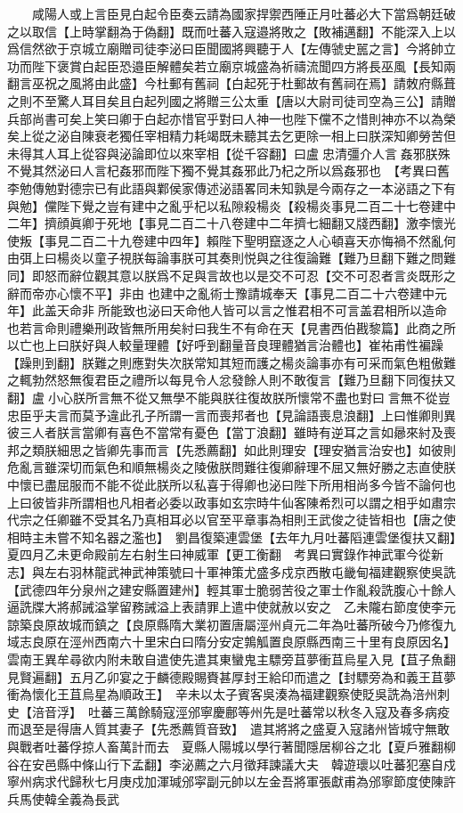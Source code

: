 　　咸陽人或上言臣見白起令臣奏云請為國家捍禦西陲正月吐蕃必大下當爲朝廷破之以取信【上時掌翻為于偽翻】既而吐蕃入寇邉將敗之【敗補邁翻】不能深入上以爲信然欲于京城立廟贈司徒李泌曰臣聞國將興聽于人【左傳虢史嚚之言】今將帥立功而陛下褒賞白起臣恐邉臣解體矣若立廟京城盛為祈禱流聞四方將長巫風【長知兩翻言巫祝之風將由此盛】今杜郵有舊祠【白起死于杜郵故有舊祠在焉】請敇府縣葺之則不至驚人耳目矣且白起列國之將贈三公太重【唐以大尉司徒司空為三公】請贈兵部尚書可矣上笑曰卿于白起亦惜官乎對曰人神一也陛下儻不之惜則神亦不以為榮矣上從之泌自陳衰老獨任宰相精力耗竭既未聽其去乞更除一相上曰朕深知卿勞苦但未得其人耳上從容與泌論即位以來宰相【從千容翻】曰盧忠清彊介人言姦邪朕殊不覺其然泌曰人言杞姦邪而陛下獨不覺其姦邪此乃杞之所以爲姦邪也　【考異曰舊李勉傳勉對德宗已有此語與鄴侯家傳述泌語畧同未知孰是今兩存之一本泌語之下有與勉】儻陛下覺之豈有建中之亂乎杞以私隙殺楊炎【殺楊炎事見二百二十七卷建中二年】擠顔眞卿于死地【事見二百二十八卷建中二年擠七細翻又牋西翻】激李懷光使叛【事見二百二十九卷建中四年】賴陛下聖明竄逐之人心頓喜天亦悔禍不然亂何由弭上曰楊炎以童子視朕每論事朕可其奏則悦與之往復論難【難乃旦翻下難之問難同】即怒而辭位觀其意以朕爲不足與言故也以是交不可忍【交不可忍者言炎既形之辭而帝亦心懷不平】非由也建中之亂術士豫請城奉天【事見二百二十六卷建中元年】此盖天命非所能致也泌曰天命他人皆可以言之惟君相不可言盖君相所以造命也若言命則禮樂刑政皆無所用矣紂曰我生不有命在天【見書西伯戡黎篇】此商之所以亡也上曰朕好與人較量理體【好呼到翻量音良理體猶言治體也】崔祐甫性褊躁【躁則到翻】朕難之則應對失次朕常知其短而護之楊炎論事亦有可采而氣色粗傲難之輒勃然怒無復君臣之禮所以每見令人忿發餘人則不敢復言【難乃旦翻下同復扶又翻】盧小心朕所言無不從又無學不能與朕往復故朕所懷常不盡也對曰言無不從豈忠臣乎夫言而莫予違此孔子所謂一言而喪邦者也【見論語喪息浪翻】上曰惟卿則異彼三人者朕言當卿有喜色不當常有憂色【當丁浪翻】雖時有逆耳之言如曏來紂及喪邦之類朕細思之皆卿先事而言【先悉薦翻】如此則理安【理安猶言治安也】如彼則危亂言雖深切而氣色和順無楊炎之陵傲朕問難往復卿辭理不屈又無好勝之志直使朕中懷已盡屈服而不能不從此朕所以私喜于得卿也泌曰陛下所用相尚多今皆不論何也上曰彼皆非所謂相也凡相者必委以政事如玄宗時牛仙客陳希烈可以謂之相乎如肅宗代宗之任卿雖不受其名乃真相耳必以官至平章事為相則王武俊之徒皆相也【唐之使相時主未嘗不知名器之濫也】　劉昌復築連雲堡【去年九月吐蕃䧟連雲堡復扶又翻】夏四月乙未更命殿前左右射生曰神威軍【更工衡翻　考異曰實錄作神武軍今從新志】與左右羽林龍武神武神策號曰十軍神策尤盛多戍京西散屯畿甸福建觀察使吳詵【武德四年分泉州之建安縣置建州】輕其軍士脆弱苦役之軍士作亂殺詵腹心十餘人逼詵牒大將郝誡溢掌留務誡溢上表請罪上遣中使就赦以安之　乙未隴右節度使李元諒築良原故城而鎮之【良原縣隋大業初置唐屬涇州貞元二年為吐蕃所破今乃修復九域志良原在涇州西南六十里宋白曰隋分安定鶉觚置良原縣西南三十里有良原因名】　雲南王異牟尋欲内附未敢自遣使先遣其東蠻鬼主驃旁苴夢衝苴烏星入見【苴子魚翻見賢遍翻】五月乙卯宴之于麟德殿賜賚甚厚封王給印而遣之【封驃旁為和義王苴夢衝為懷化王苴烏星為順政王】　辛未以太子賓客吳湊為福建觀察使貶吳詵為涪州刺史【涪音浮】　吐蕃三萬餘騎寇涇邠寧慶鄜等州先是吐蕃常以秋冬入寇及春多病疫而退至是得唐人質其妻子【先悉薦質音致】　遣其將將之盛夏入寇諸州皆城守無敢與戰者吐蕃俘掠人畜萬計而去　夏縣人陽城以學行著聞隱居柳谷之北【夏戶雅翻柳谷在安邑縣中條山行下孟翻】李泌薦之六月徵拜諫議大夫　韓遊瓌以吐蕃犯塞自戍寧州病求代歸秋七月庚戍加渾瑊邠寜副元帥以左金吾將軍張獻甫為邠寧節度使陳許兵馬使韓全義為長武